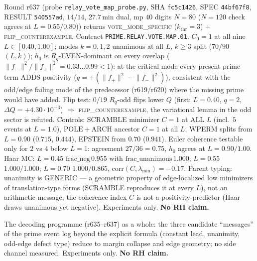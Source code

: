\documentclass[11pt]{article}
\theoremstyle{definition}
\theoremstyle{remark}
\begin{document}
\noindent Round r637 (probe \texttt{relay\_vote\_map\_probe.py},
SHA \texttt{fc5c1426}, SPEC \texttt{44bf67f8}, RESULT
\texttt{540557ad}, $14/14$, $27.7\,\mathrm{min}$ dual, mp
$40$ digits $N=80$ ($N=120$ check agrees at
$L=0.55/0.80$)) returns \textsc{vote\_mode\_specific}
($k_{\mathrm{thr}}=3$) $+$ \textsc{flip\_counterexample}.
Contract \texttt{PRIME.RELAY.VOTE.MAP.01}.  $C_0=1$ at all
nine $L\in[0.40,1.00]$; modes $k=0,1,2$ unanimous at all
$L$, $k\ge 3$ split ($70/90$ $(L,k)$); $h_0$ is
$R_q$-EVEN-dominant on every overlap
($\lVert f_-\rVert^2/\lVert f_+\rVert^2=0.33\ldots 0.99<1$):
at the critical mode every present prime term ADDS
positivity ($g=+(\lVert f_+\rVert^2-\lVert f_-\rVert^2)$),
consistent with the odd/edge failing mode of the
predecessor (r619/r620) where the missing prime would have
added.  Flip test: $0/19$ $R_q$-odd flips lower $Q$
(first: $L=0.40$, $q=2$, $\Delta Q=+4.30\cdot10^{-3}$)
$\Rightarrow$ \textsc{flip\_counterexample}, the
variational lemma in the odd sector is refuted.  Controls:
SCRAMBLE minimizer $C=1$ at ALL $L$ (incl.\ $5$ events at
$L=1.0$), $\mathrm{POLE}+\mathrm{ARCH}$ ancestor $C=1$ at
all $L$; WPERM splits from $L=0.90$ ($0.715$, $0.444$),
EPSTEIN from $0.70$ ($0.941$).  Euler coherence testable
only for $2$ vs $4$ below $L=1$: agreement $27/36=0.75$,
$h_0$ agrees at $L=0.90/1.00$.  Haar MC: $L=0.45$
$\mathrm{frac\_neg}\,0.955$ with
$\mathrm{frac\_unanimous}\,1.000$; $L=0.55$ $1.000/1.000$;
$L=0.70$ $1.000/0.865$, $\mathrm{corr}(C,\lambda_{\min})=-0.17$.
Parent typing: unanimity is GENERIC --- a geometric
property of edge-localized low minimizers of
translation-type forms (SCRAMBLE reproduces it at every
$L$), not an arithmetic message; the coherence index $C$
is not a positivity predictor (Haar draws unanimous yet
negative).  Experiments only.  \textbf{No RH claim.}

\noindent The decoding programme (r635--r637) as a whole:
the three candidate ``messages'' of the prime event log
beyond the explicit formula (constant lead, unanimity,
odd-edge defect type) reduce to margin collapse and edge
geometry; no side channel measured.
Experiments only.  \textbf{No RH claim.}
\end{document}
